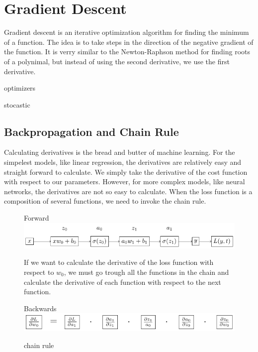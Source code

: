 \documentclass[twoside,11pt]{report}
\begin{document}
\section{Gradient Descent}
\label{sec:GD}

Gradient descent is an iterative optimization algorithm for finding the minimum of a function.
The idea is to take steps in the direction of the negative gradient of the function. It is
verry similar to the Newton-Raphson method for finding roots of a polynimal,
but instead of using the second derivative, we use the first derivative.

optimizers

stocastic


\subsection{Backpropagation and Chain Rule}
\label{sec:backpropagation}

Calculating derivatives is the bread and butter of machine learning. For the simpelest models, like linear regression,
the derivatives are relatively easy and straight forward to calculate. We simply take the derivative of the cost function
with respect to our parameters. However, for more complex models, like neural networks, the derivatives 
are not so easy to calculate.
When the loss function is a composition of several functions, we need to invoke the chain rule. 

\begin{figure}[!h]
    \begin{center}
        Forward\\
        \includegraphics[width=\textwidth]{tikzfigures/forward.pdf}\\
    \end{center}
    If we want to calculate the derivative of the loss function with respect to $w_0$,
    we must go trough all the functions in the chain and calculate the derivative of 
    each function with respect to the next function.
    \begin{center}
        Backwards\\
        \hspace{1cm}
        \includegraphics[width=\textwidth]{tikzfigures/backwards.pdf}
    \end{center}
    \caption{chain rule}\label{fig:chainrule}
\end{figure}
\end{document}
